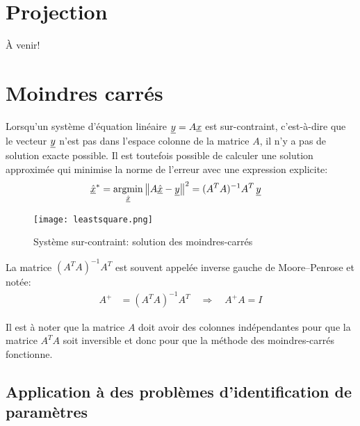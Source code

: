 \section{Projection}
\label{sec:projectionmatrix}

À venir!

\newpage
\section{Moindres carrés}
\label{sec:moindrecarre}

Lorsqu'un système d'équation linéaire $\underline{y} = A \underline{x}$ est sur-contraint, c'est-à-dire que le vecteur $\underline{y}$ n'est pas dans l'espace colonne de la matrice $A$, il n'y a pas de solution exacte possible. Il est toutefois possible de calculer une solution approximée qui minimise la norme de l'erreur avec une expression explicite:
\begin{align}
\col{\hat{x}}^* &= \operatornamewithlimits{argmin}\limits_{\col{\hat{x}}} \left\| A \col{\hat{x}} - \col{y} \right\|^2
= (A^T A)^{-1} A^T \, \col{y}
\end{align}
\begin{figure}[htbp]
	\centering
		\texttt{[image: leastsquare.png]}
	\caption{Système sur-contraint: solution des moindres-carrés}
	\label{fig:leastsquare}
\end{figure}

La matrice $(A^T A)^{-1} A^T$ est souvent appelée inverse gauche de Moore–Penrose et notée:
\begin{align}
A^{+} &= (A^T A)^{-1} A^T  \quad \Rightarrow \quad A^{+} A = I
\end{align}

Il est à noter que la matrice $A$ doit avoir des colonnes indépendantes pour que la matrice $A^T A$ soit inversible et donc pour que la méthode des moindres-carrés fonctionne.


\subsection{Application à des problèmes d'identification de paramètres}


